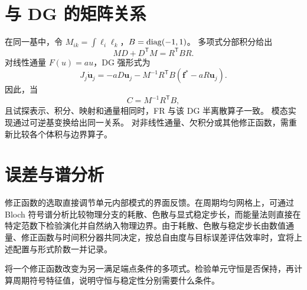 \section{与 DG 的矩阵关系}
在同一基中，令 $M_{ik}=\int\ell_i\ell_k$，$B=\operatorname{diag}(-1,1)$。
多项式分部积分给出
\[
MD+D^{\mathsf T}M=R^{\mathsf T}BR.
\]
对线性通量 $F(u)=au$，DG 强形式为
\[
J_j\dot{\bm u}_j=-aD\bm u_j-M^{-1}R^{\mathsf T}B
(\bm f^*-aR\bm u_j).
\]
因此，当
\begin{equation}\label{eq:fr-dg-lift}
C=M^{-1}R^{\mathsf T}B,
\end{equation}
且试探表示、积分、映射和通量相同时，FR 与该 DG 半离散算子一致。
模态实现通过可逆基变换给出同一关系。
对非线性通量、欠积分或其他修正函数，需重新比较各个体积与边界算子。

\section{误差与谱分析}
修正函数的选取直接调节单元内部模式的界面反馈。在周期均匀网格上，可通过 Bloch 符号谱分析比较物理分支的耗散、色散与显式稳定步长，而能量法则直接在特定范数下检验演化并自然纳入物理边界。由于耗散、色散与稳定步长由数值通量、修正函数与时间积分器共同决定，按总自由度与目标误差评估效率时，宜将上述配置与形式阶数一并记录。

{将一个修正函数改变为另一满足端点条件的多项式。检验单元守恒是否保持，再计算周期符号特征值，说明守恒与稳定性分别需要什么条件。}
